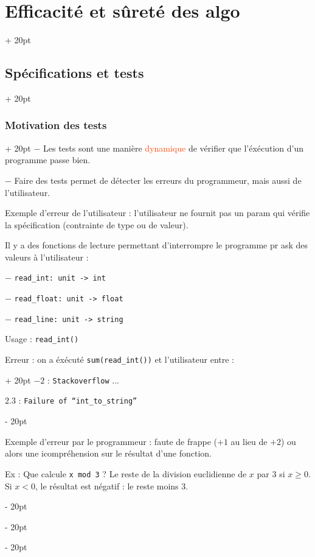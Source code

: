 \documentclass[a4paper, 12pt, twoside]{article}
\renewcommand{\emph}{\textcolor{ff4500}}
\newcommand{\ind}[1][20pt]{\advance\leftskip + #1}
\newcommand{\deind}[1][20pt]{\advance\leftskip - #1}
\newenvironment{indentedenv}[1][20pt]{\par \ind[#1]}{\par \deind}
\newenvironment{indt}[2][20pt]{#2 \begin{indentedenv}[#1]}{\end{indentedenv}} %
\begin{document}
\begin{indt}{\section{Efficacité et sûreté des algo}}
\begin{indt}{\subsection{Spécifications et tests}}
\begin{indt}{\subsubsection{Motivation des tests}}
                $-$ Les tests sont une manière \emph{dynamique} de vérifier que l'éxécution d'un programme passe bien.
                
                $-$ Faire des tests permet de détecter les erreurs du programmeur, mais aussi de l'utilisateur.
                
                Exemple d'erreur de l'utilisateur : l'utilisateur ne fournit pas un param qui vérifie la spécification (contrainte de type ou de valeur).
                
                \vspace{6pt}
                
                Il y a des fonctions de lecture permettant d'interrompre le programme pr ask des valeurs à l'utilisateur :
                
                $-$ \texttt{read\_int: unit -> int}
                
                $-$ \texttt{read\_float: unit -> float}
                
                $-$ \texttt{read\_line: unit -> string}
                
                \vspace{6pt}
                
                Usage : \texttt{read\_int()}
                
                \vspace{6pt}
                
                \begin{indt}{Erreur : on a éxécuté \texttt{sum(read\_int())} et l'utilisateur entre :}
                    $-2$ : \texttt{Stackoverflow} ...
                    
                    $2.3$ : \texttt{Failure of ``int\_to\_string''}
                \end{indt}
                
                \vspace{6pt}
                
                Exemple d'erreur par le programmeur : faute de frappe ($+1$ au lieu de $+2$) ou alors une icompréhension sur le résultat d'une fonction.
                
                Ex : Que calcule \texttt{x mod 3} ? Le reste de la division euclidienne de $x$ par $3$ si $x \ge 0$.
                Si $x < 0$, le résultat est négatif : le reste moins $3$.
                
            \end{indt}
            

\end{indt}
\end{indt}
\end{document}
